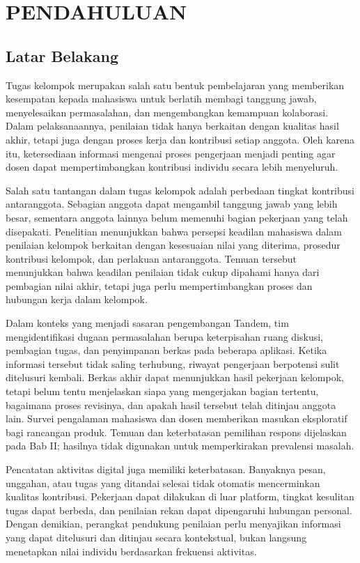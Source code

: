 \documentclass[12pt,a4paper,oneside]{report}
\begin{document}
\begingroup
{}
\setlength{\parskip}{0pt}
\tableofcontents
\endgroup
\clearpage
{}
\chapter{PENDAHULUAN}
\section{Latar Belakang}
Tugas kelompok merupakan salah satu bentuk pembelajaran yang memberikan kesempatan kepada mahasiswa untuk berlatih membagi tanggung jawab, menyelesaikan permasalahan, dan mengembangkan kemampuan kolaborasi. Dalam pelaksanaannya, penilaian tidak hanya berkaitan dengan kualitas hasil akhir, tetapi juga dengan proses kerja dan kontribusi setiap anggota. Oleh karena itu, ketersediaan informasi mengenai proses pengerjaan menjadi penting agar dosen dapat mempertimbangkan kontribusi individu secara lebih menyeluruh.

Salah satu tantangan dalam tugas kelompok adalah perbedaan tingkat kontribusi antaranggota. Sebagian anggota dapat mengambil tanggung jawab yang lebih besar, sementara anggota lainnya belum memenuhi bagian pekerjaan yang telah disepakati. Penelitian \citet{rasooli2025} menunjukkan bahwa persepsi keadilan mahasiswa dalam penilaian kelompok berkaitan dengan kesesuaian nilai yang diterima, prosedur kontribusi kelompok, dan perlakuan antaranggota. Temuan tersebut menunjukkan bahwa keadilan penilaian tidak cukup dipahami hanya dari pembagian nilai akhir, tetapi juga perlu mempertimbangkan proses dan hubungan kerja dalam kelompok.

Dalam konteks yang menjadi sasaran pengembangan Tandem, tim mengidentifikasi dugaan permasalahan berupa keterpisahan ruang diskusi, pembagian tugas, dan penyimpanan berkas pada beberapa aplikasi. Ketika informasi tersebut tidak saling terhubung, riwayat pengerjaan berpotensi sulit ditelusuri kembali. Berkas akhir dapat menunjukkan hasil pekerjaan kelompok, tetapi belum tentu menjelaskan siapa yang mengerjakan bagian tertentu, bagaimana proses revisinya, dan apakah hasil tersebut telah ditinjau anggota lain. Survei pengalaman mahasiswa dan dosen memberikan masukan eksploratif bagi rancangan produk. Temuan dan keterbatasan pemilihan respons dijelaskan pada Bab II; hasilnya tidak digunakan untuk memperkirakan prevalensi masalah.

Pencatatan aktivitas digital juga memiliki keterbatasan. Banyaknya pesan, unggahan, atau tugas yang ditandai selesai tidak otomatis mencerminkan kualitas kontribusi. Pekerjaan dapat dilakukan di luar platform, tingkat kesulitan tugas dapat berbeda, dan penilaian rekan dapat dipengaruhi hubungan personal. Dengan demikian, perangkat pendukung penilaian perlu menyajikan informasi yang dapat ditelusuri dan ditinjau secara kontekstual, bukan langsung menetapkan nilai individu berdasarkan frekuensi aktivitas.
\end{document}
